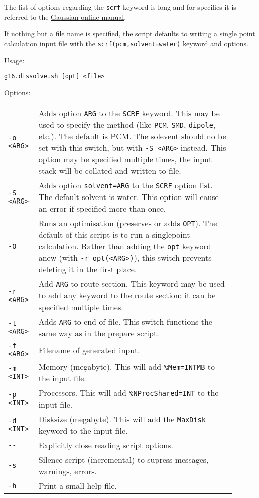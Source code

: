 \documentclass[   %
  final,          %
  a4paper         %
]{article}
\begin{document}
The list of options regarding the \texttt{scrf} keyword is long and for specifics
it is referred to the \href{http://gaussian.com/scrf/}{Gaussian online manual}.

If nothing but a file name is specified, the script defaults to writing
a single point calculation input file with the \texttt{scrf(pcm,solvent=water)} keyword and options.

Usage: 

\lstinline`g16.dissolve.sh [opt] <file>`

Options:

\begin{longtable}{p{0.1\linewidth}p{0.8\linewidth}}
  {\lstinline`-o <ARG>`} & Adds option {\lstinline`ARG`} to the \texttt{SCRF} keyword. 
    This may be used to specify the method (like \texttt{PCM}, \texttt{SMD}, \texttt{dipole}, etc.).
    The default is PCM. The solevent should no be set with this switch, 
    but with {\lstinline`-S <ARG>`} instead. 
    This option may be specified multiple times, the input stack will be collated and written to file. \\
  {\lstinline`-S <ARG>`} & Adds option \texttt{solvent={\lstinline`ARG`}} to the \texttt{SCRF} option list. 
    The default solvent is water. This option will cause an error if specified more than once.\\
  {\lstinline`-O`}       & Runs an optimisation (preserves or adds \texttt{OPT}).
    The default of this script is to run a singlepoint calculation. 
    Rather than adding the \texttt{opt} keyword anew (with {\lstinline`-r opt(<ARG>)`}), 
    this switch prevents deleting it in the first place. \\
  {\lstinline`-r <ARG>`} & Add {\lstinline`ARG`} to route section. 
    This keyword may be used to add any keyword to the route section; 
    it can be specified multiple times.\\
  {\lstinline`-t <ARG>`} & Adds {\lstinline`ARG`} to end of file. 
    This switch functions the same way as in the prepare script. \\
  {\lstinline`-f <ARG>`} & Filename of generated input. \\
  {\lstinline`-m <INT>`} & Memory (megabyte). This will add \texttt{\%Mem={\lstinline`INT`}MB} to the input file. \\
  {\lstinline`-p <INT>`} & Processors. This will add \texttt{\%NProcShared={\lstinline`INT`}} to the input file. \\
  {\lstinline`-d <INT>`} & Disksize (megabyte). This will add the \texttt{MaxDisk} keyword to the input file. \\
  {\lstinline`--`}       & Explicitly close reading script options. \\
  {\lstinline`-s`}       & Silence script (incremental) to supress messages, warnings, errors. \\
  {\lstinline`-h`}       & Print a small help file. \\
\end{longtable}
\end{document}
